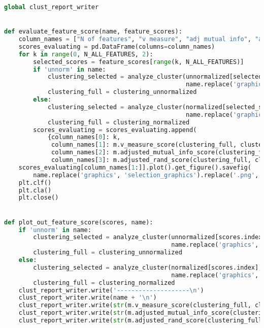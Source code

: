 \begin{lstlisting}[columns=fullflexible,language=Python]
global clust_report_writer


def evaluate_feature_score(name, feature_scores):
    column_names = ["N of features", "v measure", "adj mutual info", "adj rand score"]
    scores_evaluating = pd.DataFrame(columns=column_names)
    for k in range(0, N_ALL_FEATURES, 2):
        selected_scores = feature_scores[range(k, N_ALL_FEATURES)]
        if 'unnorm' in name:
            clustering_selected = analyze_cluster(unnormalized[selected_scores.columns],
                                                  name.replace('graphics', 'selection_graphics'), True)
            clustering_full = clustering_unnormalized
        else:
            clustering_selected = analyze_cluster(normalized[selected_scores.columns],
                                                  name.replace('graphics', 'selection_graphics'), True)
            clustering_full = clustering_normalized
        scores_evaluating = scores_evaluating.append(
            {column_names[0]: k,
             column_names[1]: m.v_measure_score(clustering_full, clustering_selected),
             column_names[2]: m.adjusted_mutual_info_score(clustering_full, clustering_selected),
             column_names[3]: m.adjusted_rand_score(clustering_full, clustering_selected)}, ignore_index=True)
    scores_evaluating[column_names[1:]].plot().get_figure().savefig(
        name.replace('graphics', 'selection_graphics').replace('.png', '_evaluated.png'))
    plt.clf()
    plt.cla()
    plt.close()


def plot_out_feature_score(scores, name):
    if 'unnorm' in name:
        clustering_selected = analyze_cluster(unnormalized[scores.index],
                                              name.replace('graphics', 'dendrograms'))
        clustering_full = clustering_unnormalized
    else:
        clustering_selected = analyze_cluster(normalized[scores.index],
                                              name.replace('graphics', 'dendrograms'))
        clustering_full = clustering_normalized
    clust_report_writer.write('--------------------\n')
    clust_report_writer.write(name + '\n')
    clust_report_writer.write(str(m.v_measure_score(clustering_full, clustering_selected)) + '\n')
    clust_report_writer.write(str(m.adjusted_mutual_info_score(clustering_full, clustering_selected)) + '\n')
    clust_report_writer.write(str(m.adjusted_rand_score(clustering_full, clustering_selected)) + '\n')



\end{lstlisting}
